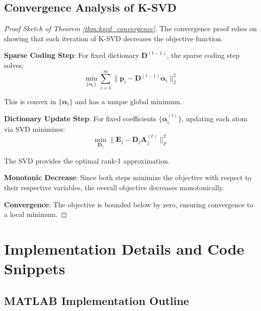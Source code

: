 \documentclass[12pt]{article}
\newcommand{\dictionary}{\mathbf{D}}
\newcommand{\patch}{\mathbf{p}}
\newcommand{\coeff}{\boldsymbol{\alpha}}
\begin{document}
\subsection{Convergence Analysis of K-SVD}
\label{app:ksvd_convergence}

\begin{proof}[Proof Sketch of Theorem \ref{thm:ksvd_convergence}]
    The convergence proof relies on showing that each iteration of K-SVD decreases the objective function.

    \textbf{Sparse Coding Step}: For fixed dictionary $\dictionary^{(t-1)}$, the sparse coding step solves:
    \begin{equation}
        \min_{\{\coeff_i\}} \sum_{i=1}^m \|\patch_i - \dictionary^{(t-1)}\coeff_i\|_2^2
    \end{equation}

    This is convex in $\{\coeff_i\}$ and has a unique global minimum.

    \textbf{Dictionary Update Step}: For fixed coefficients $\{\coeff_i^{(t)}\}$, updating each atom via SVD minimizes:
    \begin{equation}
        \min_{\dictionary_j} \|\mathbf{E}_j - \dictionary_j \mathbf{A}_j^{(t)}\|_F^2
    \end{equation}

    The SVD provides the optimal rank-1 approximation.

    \textbf{Monotonic Decrease}: Since both steps minimize the objective with respect to their respective variables, the overall objective decreases monotonically.

    \textbf{Convergence}: The objective is bounded below by zero, ensuring convergence to a local minimum.
\end{proof}

\section{Implementation Details and Code Snippets}
\label{app:implementation}

\subsection{MATLAB Implementation Outline}
\label{app:matlab_implementation}
\end{document}

